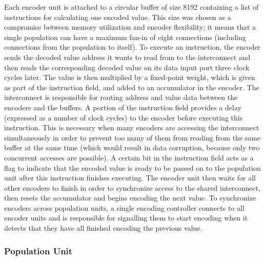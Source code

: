 \documentclass[english]{article}
\begin{document}
Each encoder unit is attached to a circular buffer of size 8192
containing a list of instructions for calculating one encoded value. 
This size was chosen as a compromise between memory utilization and encoder flexibility;
it means that a single population can have a maximum fan-in of eight connections (including connections from the population to itself).
To execute an instruction, the encoder sends the decoded value address it wants to read from to the interconnect
and then reads the corresponding decoded value on its data input port three clock cycles later.
The value is then multiplied by a fixed-point weight, which is given as part of the instruction field, and added to an accumulator in the encoder.
The interconnect is responsible for routing address and value data between the encoders and the buffers.
A portion of the instruction field provides a delay (expressed as a number of clock cycles) to the encoder before executing this instruction.
This is necessary when many encoders are accessing the interconnect simultaneously in order to prevent too many of them from reading
from the same buffer at the same time (which would result in data corruption, because only two concurrent accesses are possible).
A certain bit in the instruction field acts as a flag to indicate that the encoded value is ready to be passed on to the population unit after this
instruction finishes executing. The encoder unit then waits for all other encoders to finish in order to synchronize
access to the shared interconnect, then resets the accumulator and begins encoding the next value.
To synchronize encoders across population units, a single encoding controller connects to all encoder units and is responsible for
signalling them to start encoding when it detects that they have all finished encoding the previous value.

\subsubsection{Population Unit}
\end{document}
